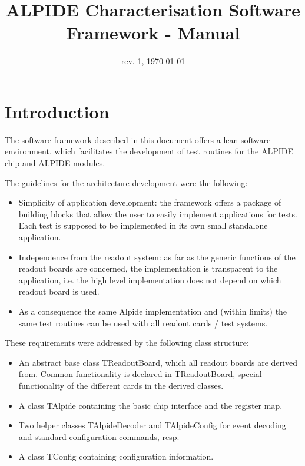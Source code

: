 \documentclass{article}
\let\oldsection\section
\renewcommand\section{\clearpage\oldsection}
\begin{document}
\title{ALPIDE Characterisation Software Framework - Manual}
\date{rev. 1, \today}

\maketitle


\section{Introduction}

The software framework described in this document offers a lean
software environment, which facilitates the development of test
routines for the ALPIDE chip and ALPIDE modules.

The guidelines for the architecture development were the following: 

\begin{itemize}
\item Simplicity of application development: the framework offers
  a package of building blocks that allow the user to easily implement
  applications for tests. Each test is supposed to be implemented in
  its own small standalone application.
\item Independence from the readout system: as far as the generic
  functions of the readout boards are concerned, the implementation
  is transparent to the application, i.e. the high level
  implementation does not depend on which readout board is used.  
\item As a consequence the same Alpide implementation and (within
  limits) the same test routines can be used with all readout cards /
  test systems.
\end{itemize}


These requirements were addressed by the following class structure:
\begin{itemize}
\item An abstract base class TReadoutBoard, which all readout boards
  are derived from. Common functionality is declared in TReadoutBoard,
  special functionality of the different cards in the derived
  classes. 
\item A class TAlpide containing the basic chip interface and the
  register map. 
\item Two helper classes TAlpideDecoder and TAlpideConfig for event
  decoding and standard configuration commands, resp.
\item A class TConfig containing configuration information.
\end{itemize}
\end{document}
